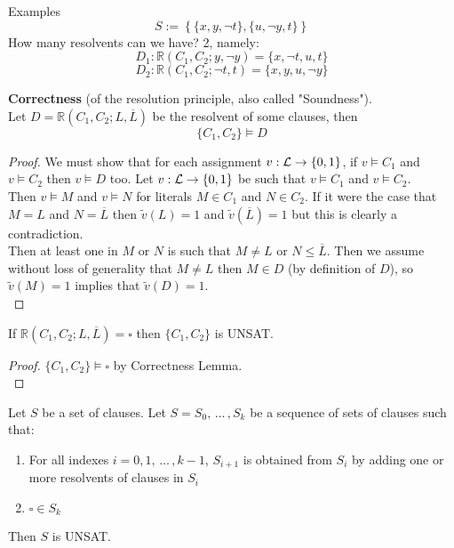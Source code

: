 Examples
$$ S := \left\{\{x,y,\neg t\}, \{u, \neg y, t\}\right\} $$
How many resolvents can we have? 2, namely: 
$$ D_1: \mathbb{R} (C_1, C_2; y, \neg y) = \{x, \neg t, u, t\} $$
$$ D_2: \mathbb{R} (C_1, C_2; \neg t, t) = \{x,y,u, \neg y\} $$

\begin{lemma}
	\textbf{Correctness} (of the resolution principle, also called "Soundness"). \\
	Let $D = \mathbb{R}(C_1, C_2; L, \overline L)$ be the resolvent of some clauses, then 
	$$\{C_1, C_2\} \models D$$
\end{lemma}

\begin{proof}
	We must show that for each assignment $v: \mathcal{L} \rightarrow \{0,1\}$, if $v \models C_1$ and $v \models C_2$ then $v \models D$ too. Let $v: \mathcal{L} \rightarrow \{0,1\}$ be such that $v \models C_1$ and $v \models C_2$.\\
	
	Then $v \models M$ and $v \models N$ for literals $M \in C_1$ and $N \in C_2$. If it were the case that $M=L$ and $N = \overline L$ then $\tilde v (L) = 1$ and $\tilde v(\overline L) = 1$ but this is clearly a contradiction.\\
	
	Then at least one in $M$ or $N$ is such that $M \neq L$ or $N \leq \overline L$. Then we assume without loss of generality that $M \neq L$ then $M \in D$ (by definition of $D$), so $\tilde v (M) = 1$ implies that $\tilde v (D) = 1$.\\
\end{proof}

\begin{corollary}
	If $\mathbb{R} (C_1, C_2; L, \overline L) = \square$ then $\{C_1, C_2\}$ is UNSAT.\\
\end{corollary}

\begin{proof}
	$\{C_1, C_2\} \models \square$ by Correctness Lemma.\\
\end{proof}

\begin{corollary}
	Let $S$ be a set of clauses. Let $S = S_0, \, \dots \, , S_k$ be a sequence of sets of clauses such that:
	\begin{enumerate}
		\item For all indexes $i = 0, 1, \, \dots \, , k-1$, $S_{i+1}$ is obtained from $S_i$ by adding one or more resolvents of clauses in $S_i$
		\item $\square \in S_k$
	\end{enumerate}
	
	Then $S$ is UNSAT.\\
\end{corollary}

